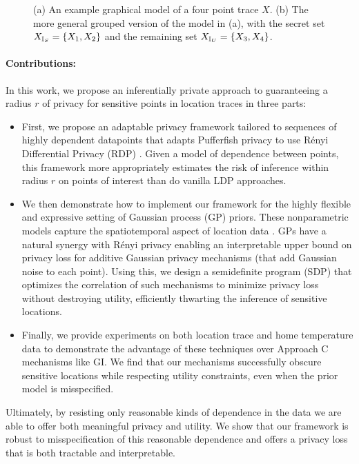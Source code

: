 \begin{figure*}[h]
	\centering
	\begin{subfigure}[b]{.45\textwidth}
		\centering
		\caption{}
		\label{fig:full model}
	\end{subfigure}
	\begin{subfigure}[b]{.45\textwidth}
		\centering
		\caption{}
		\label{fig:condensed model}
	\end{subfigure}
	\caption{(a) An example graphical model of a four point trace $X$. (b) The more general grouped version of the model in (a), with the secret set ${X_{\mathbb{I}_S}} = \{X_1, X_2\}$ and the remaining set ${X_{\mathbb{I}_U}} = \{X_3, X_4\}$. 
	}
	\label{fig:graphical models}
\end{figure*}

\paragraph{Contributions:}In this work, we propose an inferentially private approach to guaranteeing a radius $r$ of privacy for sensitive points in location traces in three parts: 
\begin{itemize}
	\item First, we propose an adaptable privacy framework tailored to sequences of highly dependent datapoints that adapts Pufferfish privacy \citep{Pufferfish} to use R\'enyi Differential Privacy (RDP) \citep{renyi}. Given a model of dependence between points, this framework more appropriately estimates the risk of inference within radius $r$ on points of interest than do vanilla LDP approaches. 
	\item We then demonstrate how to implement our framework for the highly flexible and expressive setting of Gaussian process (GP) priors. These nonparametric models capture the spatiotemporal aspect of location data \citep{PCS_GP, ATM_GP, Traffic_GP}. GPs have a natural synergy with R\'enyi privacy enabling an interpretable upper bound on privacy loss for additive Gaussian privacy mechanisms (that add Gaussian noise to each point). Using this, we design a semidefinite program (SDP) that optimizes the correlation of such mechanisms to minimize privacy loss without destroying utility, efficiently thwarting the inference of sensitive locations. 
	\item Finally, we provide experiments on both location trace and home temperature data to demonstrate the advantage of these techniques over Approach C mechanisms like GI. We find that our mechanisms successfully obscure sensitive locations while respecting utility constraints, even when the prior model is misspecified. 
\end{itemize}
 
Ultimately, by resisting only reasonable kinds of dependence in the data we are able to offer both meaningful privacy and utility. We show that our framework is robust to misspecification of this reasonable dependence and offers a privacy loss that is both tractable and interpretable. 


